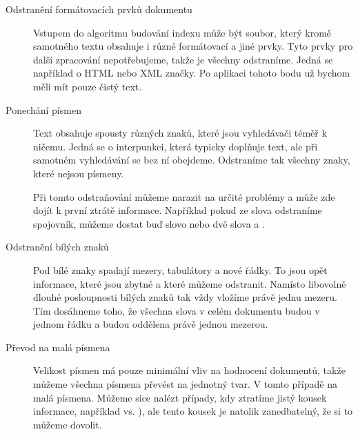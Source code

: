 \documentclass[12pt]{article}
\newcommand{\code}[1]{\texttt{#1}}
\begin{document}
\begin{description}

\item[Odstranění formátovacích prvků dokumentu] Vstupem do algoritmu budování indexu může být soubor, který kromě samotného textu obsahuje i různé formátovací a jiné prvky. Tyto prvky pro další zpracování nepotřebujeme, takže je všechny odstraníme. Jedná se například o HTML nebo XML značky. Po aplikaci tohoto bodu už bychom měli mít pouze čistý text. 

\item[Ponechání písmen] Text obsahuje spousty různých znaků, které jsou vyhledávači téměř k ničemu. Jedná se o interpunkci, která typicky doplňuje text, ale při samotném vyhledávání se bez ní obejdeme. Odstraníme tak všechny znaky, které nejsou písmeny. 

Při tomto odstraňování můžeme narazit na určité problémy a může zde dojít k první ztrátě informace. Například pokud ze slova  odstraníme spojovník, můžeme dostat buď slovo  nebo dvě slova  a . 

\item[Odstranění bílých znaků] Pod bílé znaky spadají mezery, tabulátory a nové řádky. To jsou opět informace, které jsou zbytné a které můžeme odstranit. Namísto libovolně dlouhé posloupnosti bílých znaků tak vždy vložíme právě jednu mezeru. Tím dosáhneme toho, že všechna slova v celém dokumentu budou v jednom řádku a budou oddělena právě jednou mezerou. 

\item[Převod na malá písmena] Velikost písmen má pouze minimální vliv na hodnocení dokumentů, takže můžeme všechna písmena převést na jednotný tvar. V tomto případě na malá písmena. Můžeme sice nalézt případy, kdy ztratíme jistý kousek informace, například  vs. ), ale tento kousek je natolik zanedbatelný, že si to můžeme dovolit. 



\end{description}
\end{document}
